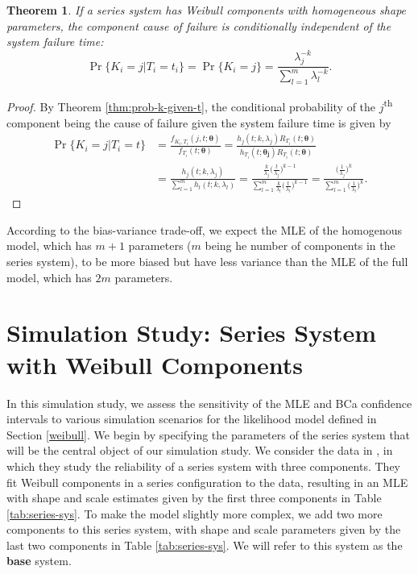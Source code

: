 \documentclass[
]{article}
\theoremstyle{definition}
\theoremstyle{plain}
\newtheorem{theorem}{Theorem}[section]
\theoremstyle{definition}
\theoremstyle{definition}
\theoremstyle{definition}
\theoremstyle{definition}
\theoremstyle{remark}
\begin{document}
\begin{theorem}
If a series system has Weibull components with homogeneous shape parameters, the
component cause of failure is conditionally independent of the system failure
time:
\[
\Pr\{K_i = j | T_i = t_i \} = \Pr\{K_i = j\} =
    \frac{\lambda_j^{-k}}{\sum_{l=1}^{m} \lambda_l^{-k}}.
\]
\end{theorem}

\begin{proof}
By Theorem \ref{thm:prob-k-given-t}, the conditional probability of the
\(j\)\textsuperscript{th} component being the cause of failure given the system
failure time is given by
\begin{align*}
\Pr\{K_i = j | T_i = t\}
    &= \frac{f_{K_i, T_i}(j, t;\boldsymbol{\theta})}{f_{T_i}(t;\boldsymbol{\theta})}
    = \frac{h_j(t;k,\lambda_j) R_{T_i}(t;\boldsymbol{\theta})}
        {h_{T_i}(t;\boldsymbol{\theta_j}) R_{T_i}(t;\boldsymbol{\theta})}\\
    &= \frac{h_j(t;k,\lambda_j)}{\sum_{l=1}^m h_l(t;k,\lambda_l)}
    = \frac{\frac{k}{\lambda_j}\bigl(\frac{t}{\lambda_j}\bigr)^{k-1}}
        {\sum_{l=1}^m \frac{k}{\lambda_l}\bigl(\frac{t}{\lambda_l}\bigr)^{k-1}}
    = \frac{\bigl(\frac{1}{\lambda_j}\bigr)^k}
        {\sum_{l=1}^m \bigl(\frac{1}{\lambda_l}\bigr)^k}.
\end{align*}
\end{proof}

According to the bias-variance trade-off, we expect the MLE of the homogenous
model, which has \(m+1\) parameters (\(m\) being he number of components in the
series system), to be more biased but have less variance than the MLE of the
full model, which has \(2m\) parameters.

\hypertarget{sim-study}{%
\section{Simulation Study: Series System with Weibull Components}\label{sim-study}}

In this simulation study, we assess the sensitivity of the MLE and BCa
confidence intervals to various simulation scenarios for the likelihood model
defined in Section \ref{weibull}. We begin by specifying the parameters of the
series system that will be the central object of our simulation study. We
consider the data in \citep{Huairu-2013}, in which they study the reliability of a
series system with three components. They fit Weibull components in a series
configuration to the data, resulting in an MLE with shape and scale estimates
given by the first three components in Table \ref{tab:series-sys}. To make the
model slightly more complex, we add two more components to this series system,
with shape and scale parameters given by the last two components in Table
\ref{tab:series-sys}. We will refer to this system as the \textbf{base} system.
\end{document}
